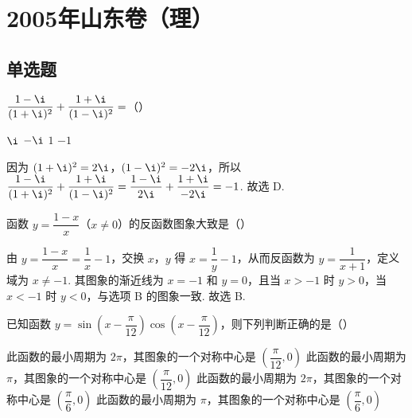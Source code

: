 \chapter{2005年山东卷（理）}
\section{单选题}
\begin{problem}
\(\dfrac{1-\i}{(1+\i)^2}+\dfrac{1+\i}{(1-\i)^2}=\)（\quad）

\choices
    {\(\i\)}
    {\(-\i\)}
    {\(1\)}
    {\(-1\)}
\end{problem}

\begin{solution}
因为 \((1+\i)^2=2\i\)，\((1-\i)^2=-2\i\)，所以
\(\dfrac{1-\i}{(1+\i)^2}+\dfrac{1+\i}{(1-\i)^2}=\dfrac{1-\i}{2\i}+\dfrac{1+\i}{-2\i}=-1\). 故选 D.
\end{solution}

\begin{problem}
函数 \(y=\dfrac{1-x}{x}\)（\(x\neq 0\)）的反函数图象大致是（\quad）

    {}
    {}
    {}
\end{problem}

\begin{solution}
由 \(y=\dfrac{1-x}{x}=\dfrac{1}{x}-1\)，交换 \(x\)，\(y\) 得 \(x=\dfrac{1}{y}-1\)，从而反函数为 \(y=\dfrac{1}{x+1}\)，定义域为 \(x\neq-1\). 其图象的渐近线为 \(x=-1\) 和 \(y=0\)，且当 \(x>-1\) 时 \(y>0\)，当 \(x<-1\) 时 \(y<0\)，与选项 B 的图象一致. 故选 B.
\end{solution}

\begin{problem}
已知函数 \(y=\sin\left(x-\dfrac{\pi}{12}\right)\cos\left(x-\dfrac{\pi}{12}\right)\)，则下列判断正确的是（\quad）

\choices
    {此函数的最小周期为 \(2\pi\)，其图象的一个对称中心是 \(\left(\dfrac{\pi}{12},0\right)\)}
    {此函数的最小周期为 \(\pi\)，其图象的一个对称中心是 \(\left(\dfrac{\pi}{12},0\right)\)}
    {此函数的最小周期为 \(2\pi\)，其图象的一个对称中心是 \(\left(\dfrac{\pi}{6},0\right)\)}
    {此函数的最小周期为 \(\pi\)，其图象的一个对称中心是 \(\left(\dfrac{\pi}{6},0\right)\)}
\end{problem}

